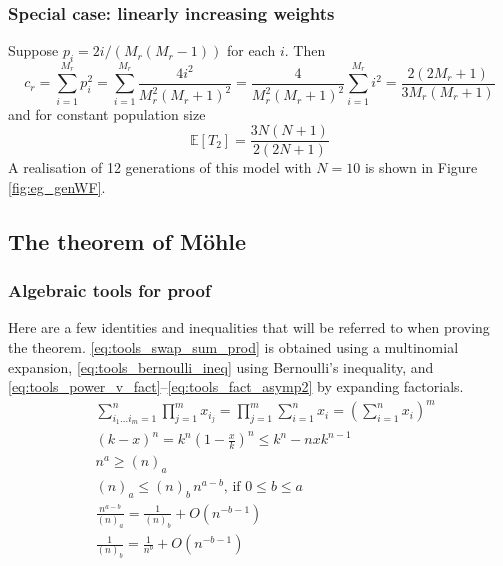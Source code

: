 \documentclass{article}
\newcommand{\E}{\mathbb{E}}
\begin{document}
\subsubsection*{Special case: linearly increasing weights}
Suppose $p_i = 2i/(M_r(M_r-1))$ for each $i$. Then
\begin{equation*}
c_r = \sum_{i=1}^{M_r} p_i^2 = \sum_{i=1}^{M_r} \frac{4i^2}{M_r^2(M_r+1)^2} = \frac{4}{M_r^2(M_r+1)^2} \sum_{i=1}^{M_r} i^2 = \frac{2(2M_r+1)}{3M_r(M_r+1)}
\end{equation*}
and for constant population size
\begin{equation*}
\E [T_2] = \frac{3N(N+1)}{2(2N+1)}
\end{equation*}
A realisation of 12 generations of this model with $N=10$ is shown in Figure \ref{fig:eg_genWF}.


\subsection*{The theorem of M\"ohle}
\subsubsection*{Algebraic tools for proof}
Here are a few identities and inequalities that will be referred to when proving the theorem. \eqref{eq:tools_swap_sum_prod} is obtained using a multinomial expansion, \eqref{eq:tools_bernoulli_ineq} using Bernoulli's inequality, and \eqref{eq:tools_power_v_fact}--\eqref{eq:tools_fact_asymp2} by expanding factorials. 
\begin{align}
& \sum_{i_1\dots i_m = 1}^n \prod_{j=1}^m x_{i_j} = \prod_{j=1}^m \sum_{i=1}^n x_i = \left( \sum_{i=1}^n x_i \right)^m \label{eq:tools_swap_sum_prod}\\
& (k-x)^n = k^n\left(1-\frac{x}{k}\right)^n \leq k^n - nxk^{n-1} \label{eq:tools_bernoulli_ineq}\\
& n^a \geq (n)_a \label{eq:tools_power_v_fact}\\
& (n)_a \leq (n)_b \,n^{a-b} \text{, if } 0\leq b\leq a \label{eq:tools_fact_taketwo_bd}\\
& \frac{n^{a-b}}{(n)_a} = \frac{1}{(n)_b} + O(n^{-b-1}) \label{eq:tools_fact_asymp1}\\
& \frac{1}{(n)_b} = \frac{1}{n^b} + O(n^{-b-1}) \label{eq:tools_fact_asymp2}
\end{align}
\end{document}
